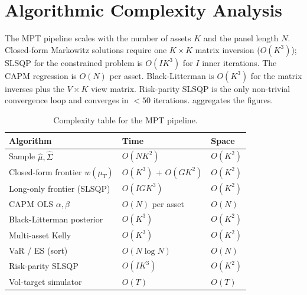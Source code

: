 \documentclass[runningheads]{llncs}
\begin{document}
\section{Algorithmic Complexity Analysis}\label{sec:complexity}
The MPT pipeline scales with the number of assets $K$ and the panel
length $N$. Closed-form Markowitz solutions require one $K\times K$
matrix inversion ($O(K^{3})$); SLSQP for the constrained problem is
$O(I K^{3})$ for $I$ inner iterations. The CAPM regression is $O(N)$
per asset. Black-Litterman is $O(K^{3})$ for the matrix inverses
plus the $V\!\times\!K$ view matrix. Risk-parity SLSQP is the only
non-trivial convergence loop and converges in $\!<\!50$ iterations.
 aggregates the figures.
\begin{table}[!htbp]
\centering\small
\caption{Complexity table for the MPT pipeline.}\label{tab:complexity}
\begin{tabular}{lll}
\toprule
Algorithm & Time & Space\\
\midrule
Sample $\hat\mu, \hat\Sigma$            & $O(NK^{2})$ & $O(K^{2})$\\
Closed-form frontier $w(\mu_T)$         & $O(K^{3})$ + $O(GK^{2})$ & $O(K^{2})$\\
Long-only frontier (SLSQP)              & $O(IGK^{3})$ & $O(K^{2})$\\
CAPM OLS $\alpha,\beta$                  & $O(N)$ per asset & $O(N)$\\
Black-Litterman posterior               & $O(K^{3})$ & $O(K^{2})$\\
Multi-asset Kelly                        & $O(K^{3})$ & $O(K^{2})$\\
VaR / ES (sort)                          & $O(N\log N)$ & $O(N)$\\
Risk-parity SLSQP                        & $O(IK^{3})$ & $O(K^{2})$\\
Vol-target simulator                     & $O(T)$ & $O(T)$\\
\bottomrule
\end{tabular}
\end{table}

\end{document}
